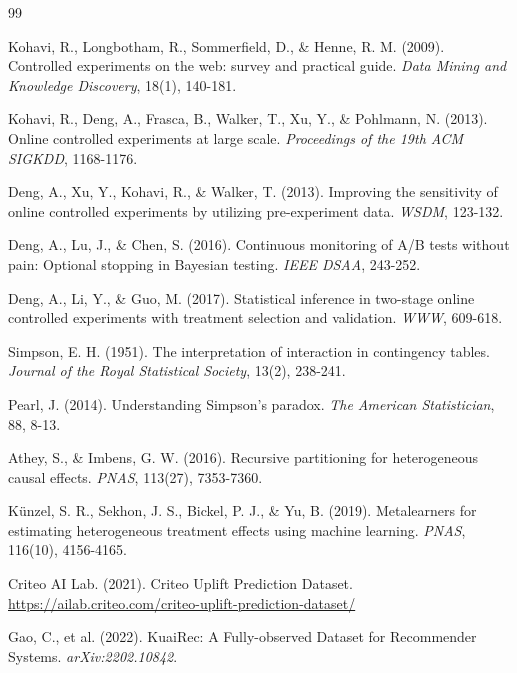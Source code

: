 \documentclass[11pt,twocolumn]{article}
\begin{document}
\begin{thebibliography}{99}

Kohavi, R., Longbotham, R., Sommerfield, D., \& Henne, R. M. (2009).
Controlled experiments on the web: survey and practical guide.
\textit{Data Mining and Knowledge Discovery}, 18(1), 140-181.

Kohavi, R., Deng, A., Frasca, B., Walker, T., Xu, Y., \& Pohlmann, N. (2013).
Online controlled experiments at large scale.
\textit{Proceedings of the 19th ACM SIGKDD}, 1168-1176.

Deng, A., Xu, Y., Kohavi, R., \& Walker, T. (2013).
Improving the sensitivity of online controlled experiments by utilizing pre-experiment data.
\textit{WSDM}, 123-132.

Deng, A., Lu, J., \& Chen, S. (2016).
Continuous monitoring of A/B tests without pain: Optional stopping in Bayesian testing.
\textit{IEEE DSAA}, 243-252.

Deng, A., Li, Y., \& Guo, M. (2017).
Statistical inference in two-stage online controlled experiments with treatment selection and validation.
\textit{WWW}, 609-618.

Simpson, E. H. (1951).
The interpretation of interaction in contingency tables.
\textit{Journal of the Royal Statistical Society}, 13(2), 238-241.

Pearl, J. (2014).
Understanding Simpson's paradox.
\textit{The American Statistician}, 88, 8-13.

Athey, S., \& Imbens, G. W. (2016).
Recursive partitioning for heterogeneous causal effects.
\textit{PNAS}, 113(27), 7353-7360.

Künzel, S. R., Sekhon, J. S., Bickel, P. J., \& Yu, B. (2019).
Metalearners for estimating heterogeneous treatment effects using machine learning.
\textit{PNAS}, 116(10), 4156-4165.

Criteo AI Lab. (2021).
Criteo Uplift Prediction Dataset.
\url{https://ailab.criteo.com/criteo-uplift-prediction-dataset/}

Gao, C., et al. (2022).
KuaiRec: A Fully-observed Dataset for Recommender Systems.
\textit{arXiv:2202.10842}.

\end{thebibliography}
\end{document}
